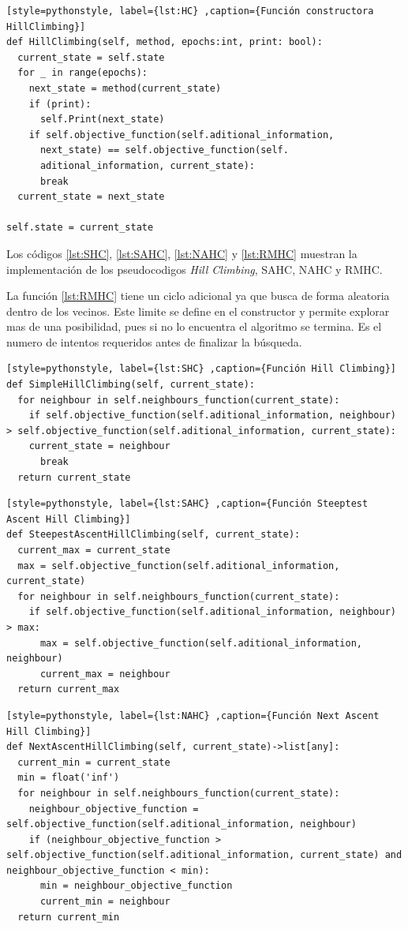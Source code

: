 \documentclass[12pt,twoside]{article}
\begin{document}
\begin{lstlisting}[style=pythonstyle, label={lst:HC} ,caption={Función constructora HillClimbing}]
def HillClimbing(self, method, epochs:int, print: bool):
  current_state = self.state
  for _ in range(epochs):
    next_state = method(current_state)
    if (print):
      self.Print(next_state)
    if self.objective_function(self.aditional_information, 
      next_state) == self.objective_function(self.
      aditional_information, current_state):
      break
  current_state = next_state

self.state = current_state
\end{lstlisting}

Los códigos \ref{lst:SHC}, \ref{lst:SAHC}, \ref{lst:NAHC} y \ref{lst:RMHC} muestran la implementación de los pseudocodigos \textit{Hill Climbing}, SAHC, NAHC y RMHC.

La función \ref{lst:RMHC} tiene un ciclo adicional ya que busca de forma aleatoria dentro de los vecinos. Este limite se define en el constructor y permite explorar mas de una posibilidad, pues si no lo encuentra el algoritmo se termina. Es el numero de intentos requeridos antes de finalizar la búsqueda.

\begin{lstlisting}[style=pythonstyle, label={lst:SHC} ,caption={Función Hill Climbing}]
def SimpleHillClimbing(self, current_state):
  for neighbour in self.neighbours_function(current_state):
    if self.objective_function(self.aditional_information, neighbour) > self.objective_function(self.aditional_information, current_state):
    current_state = neighbour
      break    
  return current_state
\end{lstlisting}

\begin{lstlisting}[style=pythonstyle, label={lst:SAHC} ,caption={Función Steeptest Ascent Hill Climbing}]
def SteepestAscentHillClimbing(self, current_state):
  current_max = current_state
  max = self.objective_function(self.aditional_information, current_state)
  for neighbour in self.neighbours_function(current_state):
    if self.objective_function(self.aditional_information, neighbour) > max:
      max = self.objective_function(self.aditional_information, neighbour)
      current_max = neighbour
  return current_max
\end{lstlisting}

\begin{lstlisting}[style=pythonstyle, label={lst:NAHC} ,caption={Función Next Ascent Hill Climbing}]
def NextAscentHillClimbing(self, current_state)->list[any]:
  current_min = current_state
  min = float('inf')
  for neighbour in self.neighbours_function(current_state):
    neighbour_objective_function = self.objective_function(self.aditional_information, neighbour)
    if (neighbour_objective_function > self.objective_function(self.aditional_information, current_state) and neighbour_objective_function < min):
      min = neighbour_objective_function
      current_min = neighbour
  return current_min
\end{lstlisting}
\end{document}
